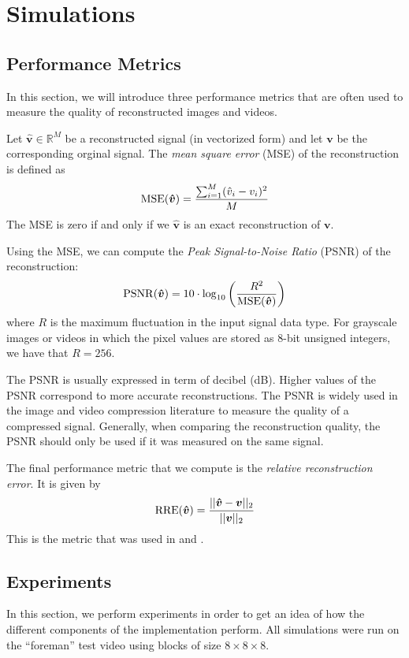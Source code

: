 \chapter{Simulations}
\label{ch:results}

\section{Performance Metrics}
In this section, we will introduce three performance metrics that are often used to measure the quality of reconstructed images and videos.

Let $\bm{\hat v} \in\mathbb{R}^M$ be a reconstructed signal (in vectorized form) and let $\bm v$ be the corresponding orginal signal.
The \emph{mean square error} (MSE) of the reconstruction is defined as
\begin{equation*}
  \operatorname*{MSE}(\bm{\hat v}) = \frac{\sum_{i=1}^M (\hat v_i - v_i)^2}{M}
\end{equation*}
The MSE is zero if and only if we $\bm{\hat v}$ is an exact reconstruction of $\bm v$.

Using the MSE, we can compute the \emph{Peak Signal-to-Noise Ratio} (PSNR) of the reconstruction:
\begin{equation*}
  \operatorname*{PSNR}(\bm{\hat v}) = 10 \cdot \log_{10} \left(\frac{R^2}{\operatorname*{MSE}(\bm{\hat v})}\right)
\end{equation*}
where $R$ is the maximum fluctuation in the input signal data type. 
For grayscale images or videos in which the pixel values are stored as 8-bit unsigned integers, we have that $R = 256$.

The PSNR is usually expressed in term of decibel (dB). 
Higher values of the PSNR correspond to more accurate reconstructions.
The PSNR is widely used in the image and video compression literature to measure the quality of a compressed signal.
Generally, when comparing the reconstruction quality, the PSNR should only be used if it was measured on the same signal.

The final performance metric that we compute is the \emph{relative reconstruction error}.
It is given by
\begin{equation*}
  \operatorname*{RRE}(\bm{\hat v}) = \frac{||\bm{\hat v} - \bm v||_2}{||\bm v||_2}
\end{equation*}
This is the metric that was used in \cite{ji2008} and \cite{pilikos2014}.

\section{Experiments}
In this section, we perform experiments in order to get an idea of how the different components of the implementation perform.
All simulations were run on the ``foreman'' test video using blocks of size $8\times 8\times 8$.

